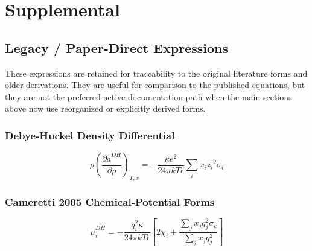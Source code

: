 \documentclass[12pt, letterpaper]{article}
\begin{document}
\section{Supplemental}

\subsection{Legacy / Paper-Direct Expressions}
\label{sec:supp_legacy_paper_direct}

These expressions are retained for traceability to the original literature forms and older derivations. They are useful for comparison to the published equations, but they are not the preferred active documentation path when the main sections above now use reorganized or explicitly derived forms.

\subsubsection{Debye-Huckel Density Differential}


\begin{equation}
    \rho\left(\frac{\partial\tilde{a}^{DH}}{\partial\rho}\right)_{T,x}
    =-\frac{\kappa e^2}{24\pi kT\epsilon}\sum_{i}x_{i}z_{i}{}^{2}\sigma_{i}
    \label{eq:dadrho_dh_explicit}
\end{equation}

\subsubsection{Cameretti 2005 Chemical-Potential Forms}


\begin{equation}
    \tilde{\mu}^{DH}_{i}= -\frac{q_{i}^2 \kappa}{24 \pi k T \epsilon}\left[2 \chi_{i}+\frac{\sum_{j} x_{j} q_{j}^2 \sigma_{k}}{\sum_{j} x_{j} q_{j}^2}\right]
    \label{eq:mu_dh_2005}
\end{equation}
\end{document}
